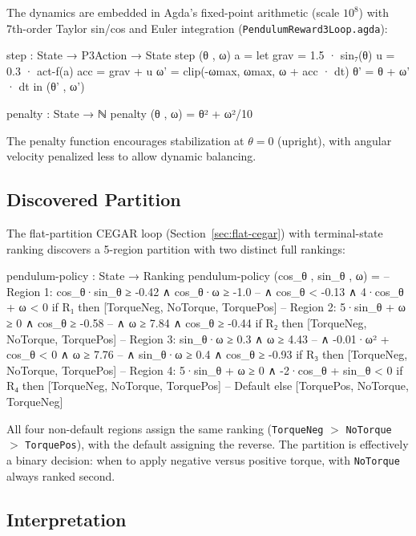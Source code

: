 \documentclass[9pt,a4paper]{article}
\newcommand{\fpath}[1]{\nolinkurl{#1}}
\theoremstyle{plain}
\theoremstyle{definition}
\theoremstyle{remark}
\begin{document}
The dynamics are embedded in Agda's fixed-point arithmetic
(scale $10^8$) with 7th-order Taylor sin/cos and Euler integration
(\fpath{PendulumReward3Loop.agda}):

\begin{spec}
step : State → P3Action → State
step (θ , ω) a =
  let grav = 1.5 · sin₇(θ)
      u    = 0.3 · act-f(a)
      acc  = grav + u
      ω'   = clip(-ωmax, ωmax, ω + acc · dt)
      θ'   = θ + ω' · dt
  in (θ' , ω')

penalty : State → ℕ
penalty (θ , ω) = θ² + ω²/10
\end{spec}

The penalty function encourages stabilization at $\theta = 0$
(upright), with angular velocity penalized less to allow dynamic
balancing.

\subsection{Discovered Partition}

The flat-partition CEGAR loop (Section~\ref{sec:flat-cegar}) with
terminal-state ranking discovers a 5-region partition with two
distinct full rankings:

\begin{spec}
pendulum-policy : State → Ranking
pendulum-policy (cos_θ , sin_θ , ω) =
  -- Region 1: cos_θ·sin_θ ≥ -0.42 ∧ cos_θ·ω ≥ -1.0
  --           ∧ cos_θ < -0.13 ∧ 4·cos_θ + ω < 0
  if R₁ then [TorqueNeg, NoTorque, TorquePos]
  -- Region 2: 5·sin_θ + ω ≥ 0 ∧ cos_θ ≥ -0.58
  --           ∧ ω ≥ 7.84 ∧ cos_θ ≥ -0.44
  if R₂ then [TorqueNeg, NoTorque, TorquePos]
  -- Region 3: sin_θ·ω ≥ 0.3 ∧ ω ≥ 4.43
  --           ∧ -0.01·ω² + cos_θ < 0 ∧ ω ≥ 7.76
  --           ∧ sin_θ·ω ≥ 0.4 ∧ cos_θ ≥ -0.93
  if R₃ then [TorqueNeg, NoTorque, TorquePos]
  -- Region 4: 5·sin_θ + ω ≥ 0 ∧ -2·cos_θ + sin_θ < 0
  if R₄ then [TorqueNeg, NoTorque, TorquePos]
  -- Default
  else        [TorquePos, NoTorque, TorqueNeg]
\end{spec}

All four non-default regions assign the same ranking
(\texttt{TorqueNeg} $>$ \texttt{NoTorque} $>$ \texttt{TorquePos}),
with the default assigning the reverse. The partition is effectively
a binary decision: when to apply negative versus positive torque,
with \texttt{NoTorque} always ranked second.

\subsection{Interpretation}
\end{document}
